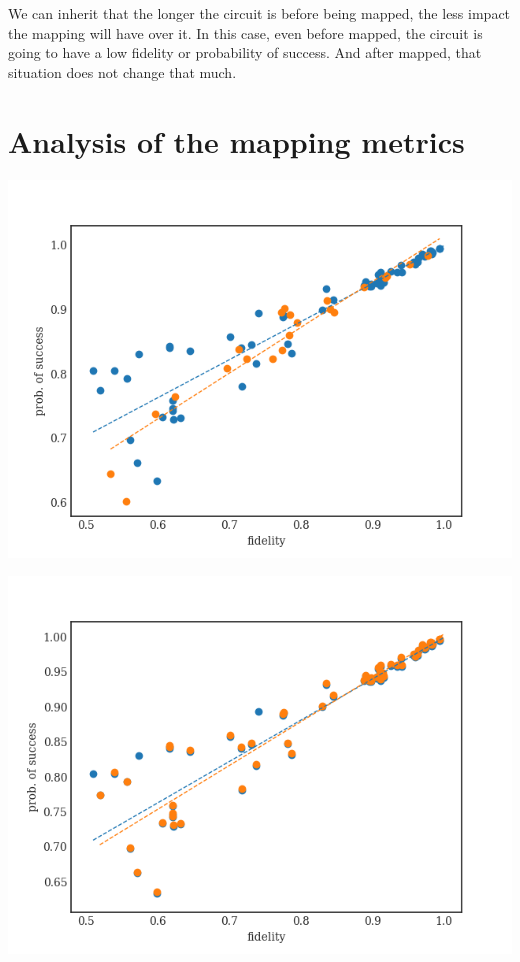 We can inherit that the longer the circuit is before being mapped, the less impact the mapping will have over it.
In this case, even before mapped, the circuit is going to have a low fidelity or probability of success.
And after mapped, that situation does not change that much.

\section{Analysis of the mapping metrics}
\label{sec:org6cf7738}

\begin{center}
\includegraphics[width=.9\linewidth]{figures/f_ps_correlation_with_meas_error.png}
\end{center}

\begin{center}
\includegraphics[width=.9\linewidth]{figures/f_ps_correlation_no_meas_error.png}
\end{center}


